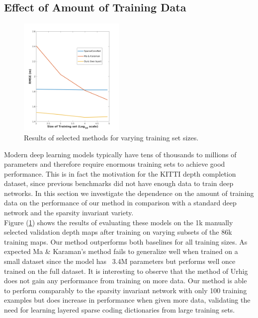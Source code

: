 \subsection{Effect of Amount of Training Data}
\label{sec:effect-training-data}
\begin{figure}
\centering
\includegraphics[width=0.45\textwidth]{trainsizeplot}
  \caption{Results of selected methods for varying training set sizes.}
  \label{fig:trainsize}
\end{figure}
Modern deep learning models typically have tens of thousands to millions of parameters and therefore require enormous training sets to achieve good performance. This is in fact the motivation for the KITTI depth completion dataset, since previous benchmarks did not have enough data to train deep networks. In this section we investigate the dependence on the amount of training data on the performance of our method in comparison with a standard deep network and the sparsity invariant variety.\\
Figure (\ref{fig:trainsize}) shows the results of evaluating these models on the 1k manually selected validation depth maps after training on varying subsets of the 86k training maps. Our method outperforms both baselines for all training sizes. As expected Ma \& Karaman's method fails to generalize well when trained on a small dataset since the model has ~3.4M parameters but performs well once trained on the full dataset. It is interesting to observe that the method of Urhig \etal does not gain any performance from training on more data. Our method is able to perform comparably to the sparsity invariant network with only 100 training examples but does increase in performance when given more data, validating the need for learning layered sparse coding dictionaries from large training sets.
